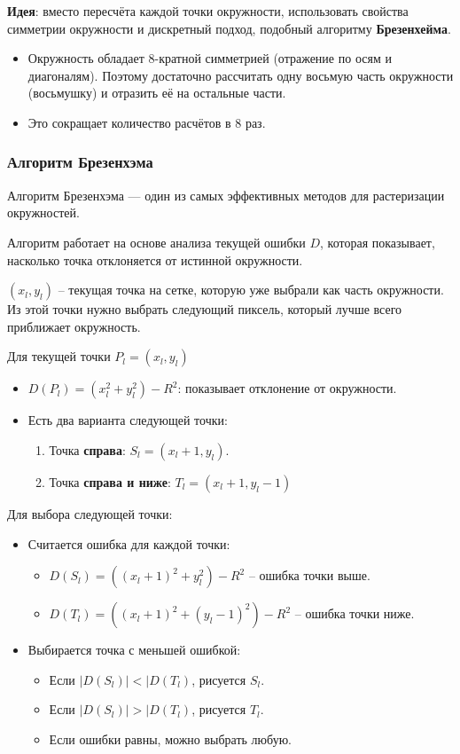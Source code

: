 \textbf{Идея}: вместо пересчёта каждой точки окружности, использовать свойства симметрии окружности и дискретный подход, подобный алгоритму \textbf{Брезенхейма}.

\begin{itemize}
    \item Окружность обладает 8-кратной симметрией (отражение по осям и диагоналям). Поэтому достаточно рассчитать одну восьмую часть окружности (восьмушку) и отразить её на остальные части.
    \item Это сокращает количество расчётов в 8 раз.
\end{itemize}

\subsubsection*{Алгоритм Брезенхэма}
Алгоритм Брезенхэма — один из самых эффективных методов для растеризации окружностей.

Алгоритм работает на основе анализа текущей ошибки $D$, которая показывает, насколько точка отклоняется от истинной окружности.

$(x_l, y_l)$ -- текущая точка на сетке, которую уже выбрали как часть окружности.
Из этой точки нужно выбрать следующий пиксель, который лучше всего приближает окружность.

Для текущей точки $P_l = (x_l, y_l)$
\begin{itemize}
    \item $D(P_l) = (x_l^2 + y_l^2) - R^2$: показывает отклонение от окружности.
    \item Есть два варианта следующей точки:
          \begin{enumerate}
              \item Точка \textbf{справа}: $S_l = (x_l + 1, y_l)$.
              \item Точка \textbf{справа и ниже}: $T_l = (x_l + 1, y_l - 1)$
          \end{enumerate}
\end{itemize}

Для выбора следующей точки:
\begin{itemize}
    \item Считается ошибка для каждой точки:
          \begin{itemize}
              \item $D(S_l) = ((x_l + 1)^2 + y_l^2) - R^2$ -- ошибка точки выше.
              \item $D(T_l) = ((x_l + 1)^2 + (y_l - 1)^2) - R^2$ -- ошибка точки ниже.
          \end{itemize}
    \item Выбирается точка с меньшей ошибкой:
          \begin{itemize}
              \item Если $|D(S_l)| < |D(T_l)$, рисуется $S_l$.
              \item Если $|D(S_l)| > |D(T_l)$, рисуется $T_l$.
              \item Если ошибки равны, можно выбрать любую.
          \end{itemize}
\end{itemize}

